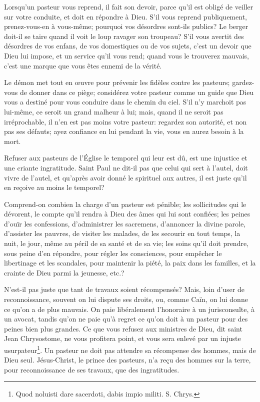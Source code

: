 \documentclass[instructions.tex]{subfiles}
\begin{document}
Lorsqu'un pasteur vous reprend, il fait son devoir, parce qu'il est obligé de veiller sur votre conduite, et doit en répondre à Dieu. S'il vous reprend publiquement, prenez-vous-en à vous-même; pourquoi vos désordres sont-ils publics? Le berger doit-il se taire quand il voit le loup ravager son troupeau? S'il vous avertit des désordres de vos enfans, de vos domestiques ou de vos sujets, c'est un devoir que Dieu lui impose, et un service qu'il vous rend; quand vous le trouverez mauvais, c'est une marque que vous êtes ennemi de la vérité.
 
Le démon met tout en œuvre pour prévenir les fidèles contre les pasteurs; gardez-vous de donner dans ce piège; considérez votre pasteur comme un guide que Dieu vous a destiné pour vous conduire dans le chemin du ciel. S'il n'y marchoit pas lui-même, ce seroit un grand malheur à lui; mais, quand il ne seroit pas irréprochable, il n'en est pas moins votre pasteur: regardez son autorité, et non pas ses défauts; ayez confiance en lui pendant la vie, vous en aurez besoin à la mort.
 
\tertio Refuser aux pasteurs de l'Église le temporel qui leur est dû, est une injustice et une criante ingratitude. Saint Paul ne dit-il pas que celui qui sert à l'autel, doit vivre de l'autel, et qu'après avoir donné le spirituel aux autres, il est juste qu'il en reçoive au moins le temporel?
 
Comprend-on combien la charge d'un pasteur est pénible; les sollicitudes qui le dévorent, le compte qu'il rendra à Dieu des âmes qui lui sont confiées; les peines d'ouïr les confessions, d'administrer les sacremens, d'annoncer la divine parole, d'assister les pauvres, de visiter les malades, de les secourir en tout temps, la nuit, le jour, même au péril de sa santé et de sa vie; les soins qu'il doit prendre, sous peine d'en répondre, pour régler les consciences, pour empêcher le libertinage et les scandales, pour maintenir la piété, la paix dans les familles, et la crainte de Dieu parmi la jeunesse, etc.?
 
N'est-il pas juste que tant de travaux soient récompensés? Mais, loin d'user de reconnoissance, souvent on lui dispute ses droits, ou, comme Caïn, on lui donne ce qu'on a de plus mauvais. On paie libéralement l'honoraire à un jurisconsulte, à un avocat, tandis qu'on ne paie qu'à regret ce qu'on doit à un pasteur pour des peines bien plus grandes. Ce que vous refusez aux ministres de Dieu, dit saint Jean Chrysostome, ne vous profitera point, et vous sera enlevé par un injuste usurpateur\footnote{Quod noluisti dare sacerdoti, dabis impio militi. S. Chrys.}. Un pasteur ne doit pas attendre sa récompense des hommes, mais de Dieu seul. Jésus-Christ, le prince des pasteurs, n'a reçu des hommes sur la terre, pour reconnoissance de ses travaux, que des ingratitudes.
 
\end{document}
